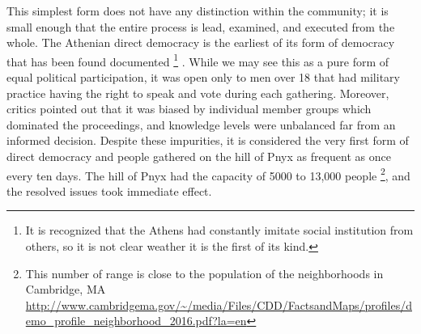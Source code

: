 This simplest form does not have any distinction within the community; it is small enough that the entire process is lead, examined, and executed from the whole.
The Athenian direct democracy is the earliest of its form of democracy that has been found documented \cite{ober2008democracy}
\footnote{It is recognized that the Athens had constantly imitate social institution from others, so it is not clear weather it is the first of its kind.}
. While we may see this as a pure form of equal political participation, it was open only to men over 18 that had military practice having the right to speak and vote during each gathering. Moreover, critics pointed out that it was biased by individual member groups which dominated the proceedings, and knowledge levels were unbalanced far from an informed decision. Despite these impurities, it is considered the very first form of direct democracy and people gathered on the hill of Pnyx as frequent as once every ten days. The hill of Pnyx had the capacity of 5000 to 13,000 people \footnote{This number of range is close to the population of the neighborhoods in Cambridge, MA \url{http://www.cambridgema.gov/~/media/Files/CDD/FactsandMaps/profiles/demo_profile_neighborhood_2016.pdf?la=en}}, and the resolved issues took immediate effect.


